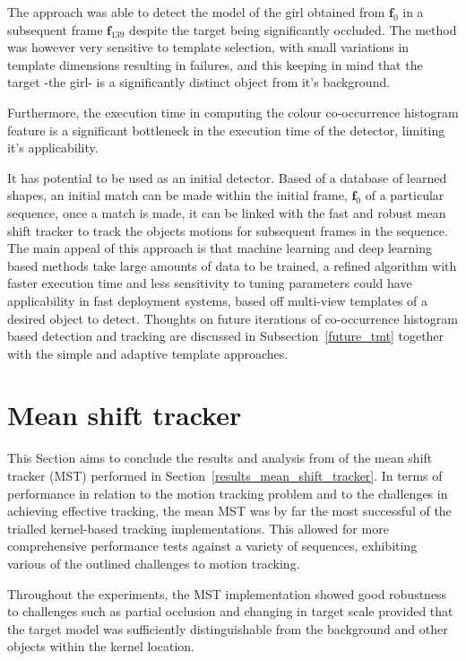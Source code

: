 The approach was able to detect the model of the girl obtained from
$\mathbf{f}_0$ in a subsequent frame $\mathbf{f}_{139}$ despite the target being
significantly occluded. 
The method was however very sensitive to template selection, with small
variations in template dimensions resulting in failures, and this keeping in
mind that the target -the girl- is a significantly distinct object from it's
background. 

Furthermore, the execution time in computing the colour co-occurrence histogram
feature is a significant bottleneck in the execution time of the detector,
limiting it's applicability. 

It has potential to be used as an initial detector. Based of a database of
learned shapes, an initial match can be made within the initial frame,
$\mathbf{f}_0$ of a particular sequence, once a match is made, it can be linked
with the fast and robust mean shift tracker to track the objects motions for
subsequent frames in the sequence. 
The main appeal of this approach is that machine learning and deep learning
based methods take large amounts of data to be trained, a refined algorithm with
faster execution time and less sensitivity to tuning parameters could have
applicability in fast deployment systems, based off multi-view templates of a
desired object to detect. Thoughts on future iterations of co-occurrence
histogram based detection and tracking are discussed in
Subsection~\ref{future_tmt} together with the simple and adaptive template
approaches.

\section{Mean shift tracker}
This Section aims to conclude the results and analysis from of the mean shift
tracker (MST) performed in Section~\ref{results_mean_shift_tracker}.
In terms of performance in relation to the motion tracking problem and to the
challenges in achieving effective tracking, the mean MST was by far
the most successful of the trialled kernel-based tracking implementations.
This allowed for more comprehensive performance tests against a variety of
sequences, exhibiting various of the outlined challenges to motion tracking.

Throughout the experiments, the MST implementation showed good robustness to
challenges such as partial occlusion and changing in target scale provided that
the target model was sufficiently distinguishable from the background and other
objects within the kernel location.

